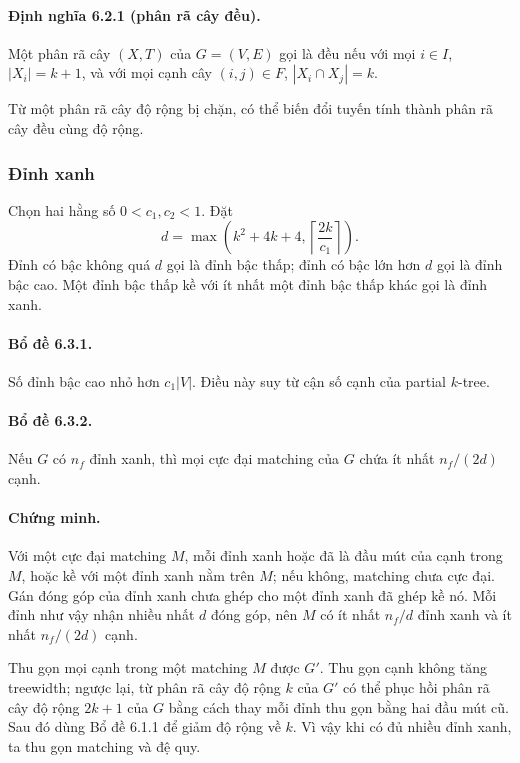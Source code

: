 \documentclass[11pt]{article}
\begin{document}
\paragraph{Định nghĩa 6.2.1 (phân rã cây đều).}
Một phân rã cây $(X,T)$ của $G=(V,E)$ gọi là đều nếu với mọi $i\in I$,
$|X_i|=k+1$, và với mọi cạnh cây $(i,j)\in F$, $|X_i\cap X_j|=k$.

Từ một phân rã cây độ rộng bị chặn, có thể biến đổi tuyến tính thành phân rã
cây đều cùng độ rộng.

\subsubsection{Đỉnh xanh}

Chọn hai hằng số $0<c_1,c_2<1$. Đặt
\[
  d=\max\left(k^2+4k+4,\left\lceil\frac{2k}{c_1}\right\rceil\right).
\]
Đỉnh có bậc không quá $d$ gọi là đỉnh bậc thấp; đỉnh có bậc lớn hơn $d$ gọi là
đỉnh bậc cao. Một đỉnh bậc thấp kề với ít nhất một đỉnh bậc thấp khác gọi là
đỉnh xanh.

\paragraph{Bổ đề 6.3.1.}
Số đỉnh bậc cao nhỏ hơn $c_1|V|$. Điều này suy từ cận số cạnh của partial
$k$-tree.

\paragraph{Bổ đề 6.3.2.}
Nếu $G$ có $n_f$ đỉnh xanh, thì mọi cực đại matching của $G$ chứa ít nhất
$n_f/(2d)$ cạnh.

\paragraph{Chứng minh.}
Với một cực đại matching $M$, mỗi đỉnh xanh hoặc đã là đầu mút của cạnh trong
$M$, hoặc kề với một đỉnh xanh nằm trên $M$; nếu không, matching chưa cực đại.
Gán đóng góp của đỉnh xanh chưa ghép cho một đỉnh xanh đã ghép kề nó. Mỗi đỉnh
như vậy nhận nhiều nhất $d$ đóng góp, nên $M$ có ít nhất $n_f/d$ đỉnh xanh và
ít nhất $n_f/(2d)$ cạnh.

Thu gọn mọi cạnh trong một matching $M$ được $G'$. Thu gọn cạnh không tăng
treewidth; ngược lại, từ phân rã cây độ rộng $k$ của $G'$ có thể phục hồi phân
rã cây độ rộng $2k+1$ của $G$ bằng cách thay mỗi đỉnh thu gọn bằng hai đầu mút
cũ. Sau đó dùng Bổ đề 6.1.1 để giảm độ rộng về $k$. Vì vậy khi có đủ nhiều
đỉnh xanh, ta thu gọn matching và đệ quy.
\end{document}
